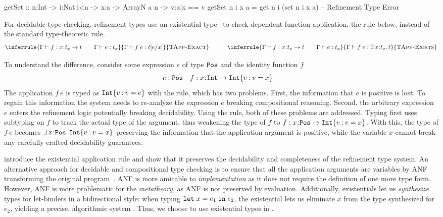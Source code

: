 \begin{code}
  getSet :: n:Int -> i:{Nat|i<n} -> x:a -> ArrayN a n -> {v:a|x == v}
  getSet n i x a = get n i (set n i x a) -- Refinement Type Error
\end{code}

For decidable type checking, refinement types use an existential type~\cite{Knowles09} to check
dependent function application, \ie the  rule below, instead
of the standard type-theoretic  rule.
%
$$
{
\inferrule%
{
    \hastype{\tcenv}{f}{\functype{x}{\stype_x}{t}} \qquad \hastype{\tcenv}{e}{\stype_x}
 }{
    \hastype{\tcenv}{\app{f}{e}}{\stype\subst{}{x}{e}}
}{\rulename{TApp-Exact}} \qquad\quad
\inferrule%
{
    \hastype{\tcenv}{f}{\functype{x}{\stype_x}{t}} \qquad \hastype{\tcenv}{e}{\stype_x}
 }{
    \hastype{\tcenv}{\app{f}{e}}{\existype{x}{\stype_x}{\stype}}
}{\rulename{TApp-Exists}}
}
$$

To understand the difference, consider
some expression $e$ of type $\texttt{Pos}$ and the identity function $f$
%
\begin{align*}
    e&:\texttt{Pos} & f&:x\hspace{0.05em}{:}\hspace{0.05em} \texttt{Int} \rightarrow {\ensuremath{{\texttt{Int}}\{v \mathbin{:} v = x\}}}
\end{align*}
%
The application $f\ e$ is typed as ${{\texttt{Int}}\{v \mathbin{:} v = e\}}$ with the  rule,
which has two problems.
%
First, the information that $e$ is positive is lost.
%
To regain this information the system needs to re-analyze the expression $e$
breaking compositional reasoning.
%
Second, the arbitrary expression $e$ enters the refinement logic
potentially breaking decidability.
%
Using the  rule, both of these problems are addressed.
Typing first uses subtyping on $f$ to track the actual type of the argument,
thus weakening the type of $f$ to $f:x\hspace{0.05em}{:}\hspace{0.05em} \texttt{Pos} \rightarrow {\ensuremath{{\texttt{Int}}\{v \mathbin{:} v = x\}}}$.
%
With this, the type of $f\ e$ becomes $\exists\, x\hspace{0.05em}{:}\hspace{0.05em} \texttt{Pos}.\, {{\texttt{Int}}\{v \mathbin{:} v = x\}}$
preserving the information that the application argument is positive,
while the variable $x$ cannot break any carefully crafted decidability guarantees.

\citet{Knowles09} introduce the existential application rule
and show that it preserves the decidability and completeness of the refinement type system.
%
An alternative approach for decidable and compositional type checking
is to ensure that all the application arguments
are variables by ANF transforming the original
program~\cite{Flanagan93}.
%
ANF is more amicable to \emph{implementation}
as it does not require the definition of one
more type form.
%
However, ANF is more problematic for the
\emph{metatheory}, as ANF is not preserved
by evaluation.
%
Additionally, existentials let us \emph{synthesize}
types for let-binders in a bidirectional style: when
typing ${{\texttt{let}}}\;x{{\;=\;}}e_1\;{{\texttt{in}}}\;e_2$, the existential lets
us eliminate $x$ from the type synthesized for
$e_2$, yielding a precise, algorithmic
system \cite{CosmanICFP17}.
%
Thus, we choose to use existential types in \sysrf.


